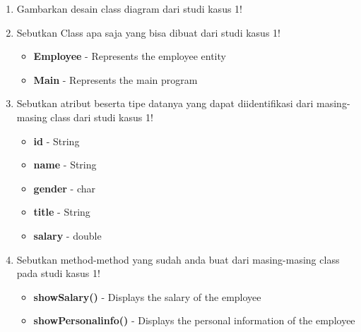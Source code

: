 \documentclass[12pt,titlepage]{article}
\begin{document}
\begin{enumerate}
    \item {
        Gambarkan desain class diagram dari studi kasus 1!

    }
    \item {
        Sebutkan Class apa saja yang bisa dibuat dari studi kasus 1!

        \begin{itemize}
            \item \textbf{Employee} - Represents the employee entity
            \item \textbf{Main} - Represents the main program
        \end{itemize}
    }
    \item {
        Sebutkan atribut beserta tipe datanya yang dapat diidentifikasi dari masing-masing class dari studi kasus 1!

        \begin{itemize}
            \item \textbf{id} - String
            \item \textbf{name} - String
            \item \textbf{gender} - char
            \item \textbf{title} - String
            \item \textbf{salary} - double
        \end{itemize}
    }
    \item {
        Sebutkan method-method yang sudah anda buat dari masing-masing class pada studi kasus 1!
    
        \begin{itemize}
            \item \textbf{showSalary()} - Displays the salary of the employee
            \item \textbf{showPersonalinfo()} - Displays the personal information of the employee
        \end{itemize}
    }
\end{enumerate}
\end{document}
